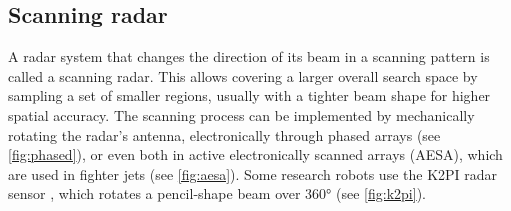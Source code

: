 \subsection{Scanning radar}\label{scanning-radar}

A radar system that changes the direction of its beam in a scanning pattern is called a scanning radar. This allows covering a larger overall search space by sampling a set of smaller regions, usually with a tighter beam shape for higher spatial accuracy. The scanning process can be implemented by mechanically rotating the radar's antenna, electronically through phased arrays (see \cref{fig:phased}), or even both in active electronically scanned arrays (AESA), which are used in fighter jets (see \cref{fig:aesa}). Some research robots use the K2PI radar sensor \cite{Rouveure2008}, which rotates a pencil-shape beam over \ang{360} (see \cref{fig:k2pi}).

